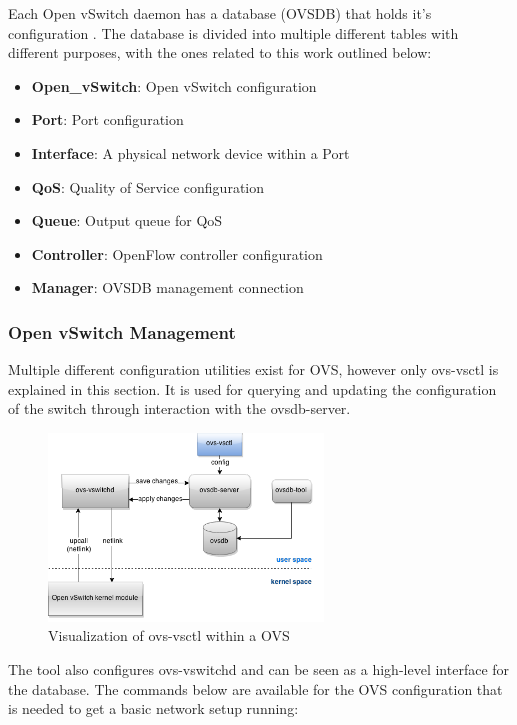 Each Open vSwitch daemon has a database (OVSDB) that holds it's configuration \cite{ovsdbmanual}. The database is divided into multiple different tables with different purposes, with the ones related to this work outlined below:
\begin{itemize}
\item \textbf{Open\_vSwitch}: Open vSwitch configuration
\item \textbf{Port}: Port configuration
\item \textbf{Interface}: A physical network device within a Port
\item \textbf{QoS}: Quality of Service configuration
\item \textbf{Queue}: Output queue for QoS
\item \textbf{Controller}: OpenFlow controller configuration
\item \textbf{Manager}: OVSDB management connection
\end{itemize}

\newpage
\subsubsection{Open vSwitch Management}

Multiple different configuration utilities exist for OVS, however only ovs-vsctl is explained in this section. It is used for querying and updating the configuration of the switch through interaction with the ovsdb-server.

\begin{figure}[H]
\centering
\includegraphics[width=0.65\textwidth]{images/fundamentals/openvswitch_vsctl.png}
\caption{Visualization of ovs-vsctl within a OVS}
\end{figure}

The tool also configures ovs-vswitchd and can be seen as a high-level interface for the database.
The commands below are available for the OVS configuration that is needed to get a basic network setup running:

